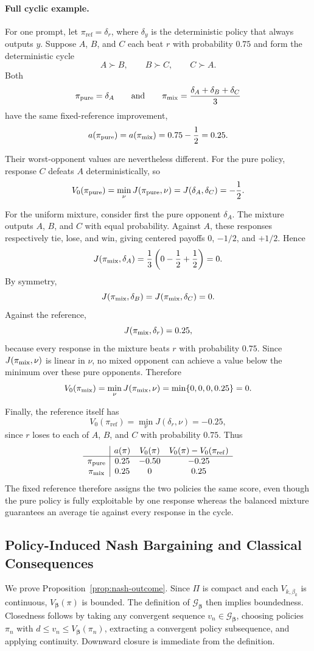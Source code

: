 \documentclass{article}
\theoremstyle{remark}
\theoremstyle{plain}
\newcommand{\G}{\mathcal{G}}
\newcommand{\piref}{\pi_{\mathrm{ref}}}
\begin{document}
\paragraph{Full cyclic example.}
For one prompt, let $\piref=\delta_r$, where $\delta_y$ is the deterministic
policy that always outputs $y$. Suppose $A$, $B$, and $C$ each beat $r$
with probability $0.75$ and form the deterministic cycle
\[
A\succ B,\qquad B\succ C,\qquad C\succ A.
\]
Both
\[
\pi_{\rm pure}=\delta_A
\qquad\text{and}\qquad
\pi_{\rm mix}=\frac{\delta_A+\delta_B+\delta_C}{3}
\]
have the same fixed-reference improvement,
\[
a(\pi_{\rm pure})
=
a(\pi_{\rm mix})
=
0.75-\frac12
=
0.25.
\]

Their worst-opponent values are nevertheless different. For the pure
policy, response $C$ defeats $A$ deterministically, so
\[
V_0(\pi_{\rm pure})
=
\min_{\nu} J(\pi_{\rm pure},\nu)
=
J(\delta_A,\delta_C)
=
-\frac12.
\]

For the uniform mixture, consider first the pure opponent $\delta_A$.
The mixture outputs $A$, $B$, and $C$ with equal probability. Against
$A$, these responses respectively tie, lose, and win, giving centered
payoffs $0$, $-1/2$, and $+1/2$. Hence
\[
J(\pi_{\rm mix},\delta_A)
=
\frac13
\left(
0-\frac12+\frac12
\right)
=
0.
\]
By symmetry,
\[
J(\pi_{\rm mix},\delta_B)
=
J(\pi_{\rm mix},\delta_C)
=
0.
\]
Against the reference,
\[
J(\pi_{\rm mix},\delta_r)=0.25,
\]
because every response in the mixture beats $r$ with probability $0.75$.
Since $J(\pi_{\rm mix},\nu)$ is linear in $\nu$, no mixed opponent can
achieve a value below the minimum over these pure opponents. Therefore
\[
V_0(\pi_{\rm mix})
=
\min_{\nu}J(\pi_{\rm mix},\nu)
=
\min\{0,0,0,0.25\}
=
0.
\]

Finally, the reference itself has
\[
V_0(\piref)
=
\min_{\nu}J(\delta_r,\nu)
=
-0.25,
\]
since $r$ loses to each of $A$, $B$, and $C$ with probability $0.75$.
Thus
\[
\begin{array}{c|ccc}
& a(\pi) & V_0(\pi) & V_0(\pi)-V_0(\piref)\\
\hline
\pi_{\rm pure} & 0.25 & -0.50 & -0.25\\
\pi_{\rm mix}  & 0.25 & 0     &  0.25
\end{array}
\]
The fixed reference therefore assigns the two policies the same score,
even though the pure policy is fully exploitable by one response whereas
the balanced mixture guarantees an average tie against every response
in the cycle.

\subsection{Policy-Induced Nash Bargaining and Classical Consequences}
\label{app:nash-properties}
We prove Proposition~\ref{prop:nash-outcome}. Since $\Pi$ is compact and each $V_{k,\beta_k}$ is continuous, $V_{\boldsymbol\beta}(\pi)$ is bounded. The definition of $\G_{\boldsymbol\beta}$ then implies boundedness. Closedness follows by taking any convergent sequence $v_n\in\G_{\boldsymbol\beta}$, choosing policies $\pi_n$ with $d\le v_n\le V_{\boldsymbol\beta}(\pi_n)$, extracting a convergent policy subsequence, and applying continuity. Downward closure is immediate from the definition.
\end{document}
